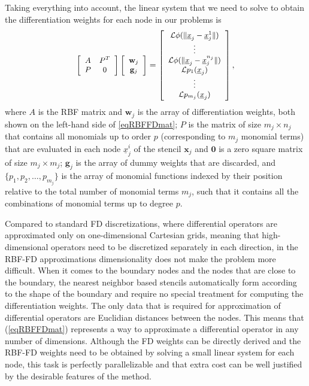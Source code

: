 \documentclass{UUThesisTemplate}
\begin{document}
%
\par
Taking everything into account, the linear system that we need to solve to obtain the differentiation weights for each node in our problems is
\begin{equation}
{\footnotesize{
\label{eq:D2}
\left[\begin{array}{cc}
A & P^T \\
P & 0 \\
\end{array}\right]
\left[\begin{array}{c}
{\mathbf{w}}_j\\
{\mathbf{g}}_j\\
\end{array}\right]=
\left[\begin{array}{c}
\mathcal{L}\phi(\|\underline{x}_{j}-\underline{x}_j^{1}\|)\\
\vdots \\
\mathcal{L}\phi(\|\underline{x}_{j}-\underline{x}_j^{n_j}\|)\\
\mathcal{L}p_1(\underline{x}_j)\\
\vdots\\
\mathcal{L}p_{m_j}(\underline{x}_j)
\end{array}\right],
}}
\end{equation}
where $A$ is the RBF matrix and $\mathbf{w}_j$ is the array of differentiation weights, both shown on the left-hand side of \eqref{eqRBFFDmat}; $P$ is the matrix of size $m_j \times n_j$ that contains all monomials up to order $p$ (corresponding to $m_j$ monomial terms) that are evaluated in each node $\underline{x}_j^i$ of the stencil $\mathbf{x}_j$ and $\mathbf{0}$ is a zero square matrix of size $m_j \times m_j$; $\mathbf{g}_j$ is the array of dummy weights that are discarded, and $\{p_1, p_2, \ldots, p_{m_j}\}$ is the array of monomial functions indexed by their position relative to the total number of monomial terms $m_j$, such that it contains all the combinations of monomial terms up to degree $p$.
\par
Compared to standard FD discretizations, where differential operators are approximated only on one-dimensional Cartesian grids, meaning that high-dimensional operators need to be discretized separately in each direction, in the RBF-FD approximations dimensionality does not make the problem more difficult. When it comes to the boundary nodes and the nodes that are close to the boundary, the nearest neighbor based stencils automatically form according to the shape of the boundary and require no special treatment for computing the differentiation weights. The only data that is required for approximation of differential operators are Euclidian distances between the nodes. This means that (\ref{eqRBFFDmat}) represents a way to approximate a differential operator in any number of dimensions. Although the FD weights can be directly derived and the RBF-FD weights need to be obtained by solving a small linear system for each node, this task is perfectly parallelizable and that extra cost can be well justified by the desirable features of the method.
\end{document}
